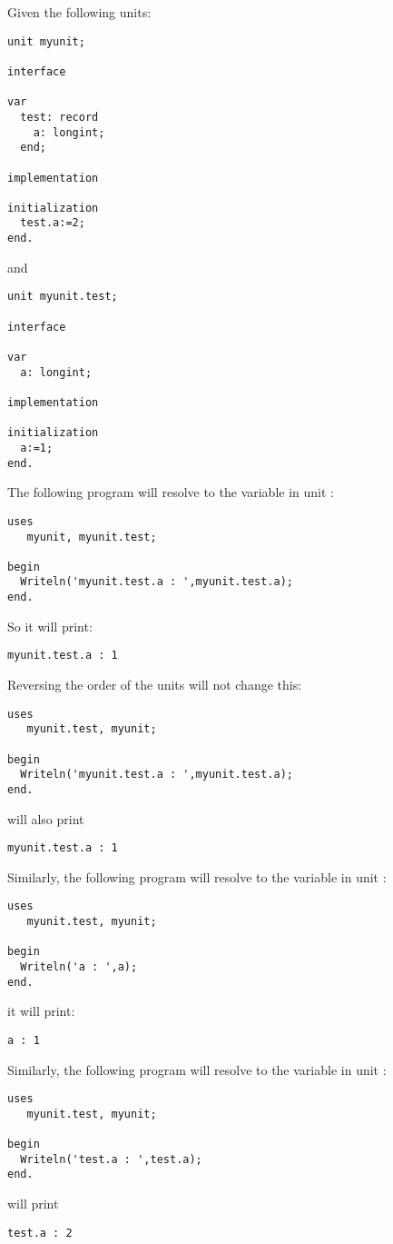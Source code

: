 Given the following units:
\begin{verbatim}
unit myunit;

interface

var
  test: record
    a: longint;
  end;

implementation

initialization
  test.a:=2;
end.
\end{verbatim}
and
\begin{verbatim}
unit myunit.test;

interface

var
  a: longint;

implementation

initialization
  a:=1;
end.
\end{verbatim}
The following program will resolve  to the variable  in unit :
\begin{verbatim}
uses
   myunit, myunit.test;

begin
  Writeln('myunit.test.a : ',myunit.test.a);
end.
\end{verbatim}
So it will print:
\begin{verbatim}
myunit.test.a : 1
\end{verbatim}
Reversing the order of the units will not change this:
\begin{verbatim}
uses
   myunit.test, myunit;

begin
  Writeln('myunit.test.a : ',myunit.test.a);
end.
\end{verbatim}
will also print
\begin{verbatim}
myunit.test.a : 1
\end{verbatim}
Similarly, the following program will resolve  to the variable  in unit :
\begin{verbatim}
uses
   myunit.test, myunit;

begin
  Writeln('a : ',a);
end.
\end{verbatim}
it will print:
\begin{verbatim}
a : 1
\end{verbatim}
Similarly, the following program will resolve  to the variable  in unit :
\begin{verbatim}
uses
   myunit.test, myunit;

begin
  Writeln('test.a : ',test.a);
end.
\end{verbatim}
will print
\begin{verbatim}
test.a : 2
\end{verbatim}


